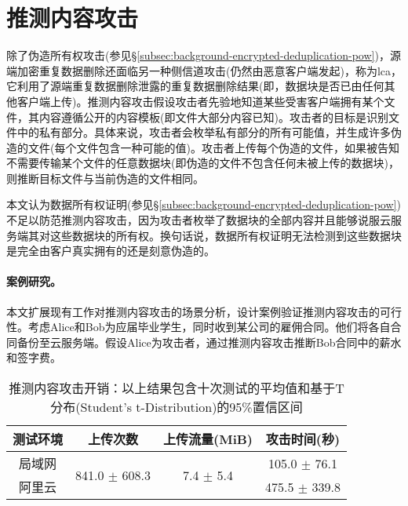 \section{推测内容攻击}
\label{sec:featurespy-attack}

除了伪造所有权攻击(参见\S\ref{subsec:background-encrypted-deduplication-pow})，源端加密重复数据删除还面临另一种侧信道攻击(仍然由恶意客户端发起)，称为\gls{lca}，它利用了源端重复数据删除泄露的重复数据删除结果(即，数据块是否已由任何其他客户端上传)。推测内容攻击假设攻击者先验地知道某些受害客户端拥有某个文件，其内容遵循公开的内容模板(即文件大部分内容已知)。攻击者的目标是识别文件中的私有部分。具体来说，攻击者会枚举私有部分的所有可能值，并生成许多伪造的文件(每个文件包含一种可能的值)。攻击者上传每个伪造的文件，如果被告知不需要传输某个文件的任意数据块(即伪造的文件不包含任何未被上传的数据块)，则推断目标文件与当前伪造的文件相同。

本文认为数据所有权证明(参见\S\ref{subsec:background-encrypted-deduplication-pow})不足以防范推测内容攻击，因为攻击者枚举了数据块的全部内容并且能够说服云服务端其对这些数据块的所有权。换句话说，数据所有权证明无法检测到这些数据块是完全由客户真实拥有的还是刻意伪造的。

\paragraph*{案例研究。}
本文扩展现有工作对推测内容攻击的场景分析，设计案例验证推测内容攻击的可行性。考虑Alice和Bob为应届毕业学生，同时收到某公司的雇佣合同。他们将各自合同备份至云服务端。假设Alice为攻击者，通过推测内容攻击推断Bob合同中的薪水和签字费。

\begin{table}[!htb]
    \small
    \centering
    \caption{推测内容攻击开销：以上结果包含十次测试的平均值和基于T分布(Student's t-Distribution)的95\%置信区间}
    \label{tab:LRI-verify}
    \begin{tabular}{@{}cccc@{}}
        \toprule
        测试环境 & 上传次数                           & 上传流量(MiB)                  & 攻击时间(秒)      \\ \midrule
        局域网   & \multirow{2}{*}{841.0 $\pm$ 608.3} & \multirow{2}{*}{7.4 $\pm$ 5.4} & 105.0 $\pm$ 76.1  \\
        阿里云   &                                    &                                & 475.5 $\pm$ 339.8 \\
        \bottomrule
    \end{tabular}
\end{table}

